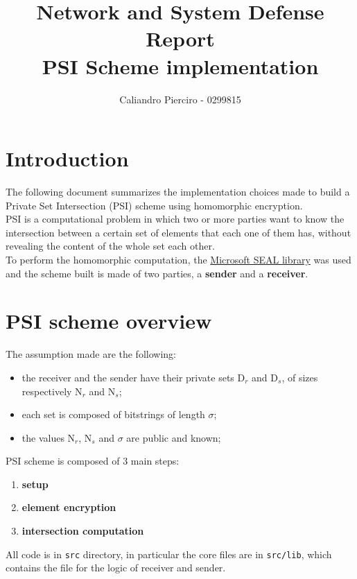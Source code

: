 \documentclass[10pt]{extarticle}
\title{Network and System Defense Report\\PSI Scheme implementation}
\author{Caliandro Pierciro - 0299815}
\begin{document}
\maketitle
\tableofcontents
\newpage

\section{Introduction}
The following document summarizes the implementation choices made to build a Private Set Intersection (PSI) scheme using homomorphic encryption.\\
PSI is a computational problem in which two or more parties want to know the intersection between a certain set of elements that each one of them has, without revealing the content of the whole set each other.\\
To perform the homomorphic computation, the \href{https://github.com/Microsoft/SEAL}{Microsoft SEAL library} was used and the scheme built is made of two parties, a \textbf{sender} and a \textbf{receiver}.
\section{PSI scheme overview}
The assumption made are the following:
\begin{itemize}
	\item the receiver and the sender have their private sets D$_r$ and D$_s$, of sizes respectively N$_r$ and N$_s$;
	\item each set is composed of bitstrings of length $\sigma$;
	\item the values N$_r$, N$_s$ and $\sigma$ are public and known;
\end{itemize}
PSI scheme is composed of 3 main steps:
\begin{enumerate}
	\item \textbf{setup}
	\item \textbf{element encryption}
	\item \textbf{intersection computation}
\end{enumerate}
All code is in \texttt{src} directory, in particular the core files are in \texttt{src/lib}, which contains the file for the logic of receiver and sender.
\end{document}
